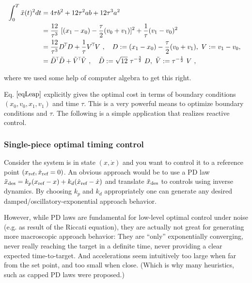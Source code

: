 $$\begin{align}
\int_0^T \ddot x(t)^2 dt
&= 4 \tau b^2  + 12 \tau^2 ab + 12 \tau^3 a^2 \\
&= \frac{12}{\tau^3}~[(x_1 - x_0)-\frac{\tau}{2}(v_0+v_1)]^2+\frac{1}{\tau}(v_1-v_0)^2 \label{eqLeap}\\
&= \frac{12}{\tau^3} D^\T D + \frac{1}{\tau} V^\T V \comma D := (x_1 - x_0)-\frac{\tau}{2}(v_0+v_1),~ V:=v_1-v_0,~ \\
&= \tilde D^\T \tilde D + \tilde V^\T \tilde V \comma
\tilde D := \sqrt{12}~ \tau^{-\frac{3}{2}}~ D,~ \tilde V := \tau^{-\half}~ V ~,
\label{eqLeapSOS}
\end{align}$$

where we used some help of computer algebra to get this right.

Eq. $\eqref{eqLeap}$ explicitly gives the optimal cost in terms of
boundary conditions $(x_0,v_0,x_1,v_1)$ and time $\tau$. This is a very powerful means to optimize boundary conditions and $\tau$. The following is a simple application that realizes reactive control.

\subsubsection{Single-piece optimal timing control}

Consider the system is in state $(x,\dot x)$ and you want to control it to a reference point $(x_{\text{ref}}, \dot x_{\text{ref}}=0)$. An obvious approach would be to use a PD law $\ddot x_{\text{des}} = k_p (x_{\text{ref}} - x) + k_d (\dot x_{\text{ref}} - \dot x)$ and translate $\ddot x_{\text{des}}$ to controls using inverse dynamics. By choosing $k_p$ and $k_d$ appropriately one can generate any desired damped/oscillatory-exponential approach behavior.

However, while PD laws are fundamental for low-level optimal control under noise (e.g. as result of the Riccati equation), they are actually not great for generating more macroscopic approach behavior: They are ``only'' exponentially converging, never really reaching the target in a definite time, never providing a clear expected time-to-target. And accelerations seem intuitively too large when far from the set point, and too small when close. (Which is why many heuristics, such as capped PD laws were proposed.)

